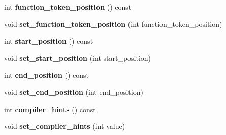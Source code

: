 \begin{DoxyCompactItemize}
\item 
int {\bfseries function\+\_\+token\+\_\+position} () const \hypertarget{classv8_1_1internal_1_1_shared_function_info_a5b7a18812dfb0269806e52073d1b91d8}{}\label{classv8_1_1internal_1_1_shared_function_info_a5b7a18812dfb0269806e52073d1b91d8}

\item 
void {\bfseries set\+\_\+function\+\_\+token\+\_\+position} (int function\+\_\+token\+\_\+position)\hypertarget{classv8_1_1internal_1_1_shared_function_info_a2f9fa5e11c55f28fe3a606d7411e9446}{}\label{classv8_1_1internal_1_1_shared_function_info_a2f9fa5e11c55f28fe3a606d7411e9446}

\item 
int {\bfseries start\+\_\+position} () const \hypertarget{classv8_1_1internal_1_1_shared_function_info_a0eb9c75c3fdae7d2007cbe23043abc73}{}\label{classv8_1_1internal_1_1_shared_function_info_a0eb9c75c3fdae7d2007cbe23043abc73}

\item 
void {\bfseries set\+\_\+start\+\_\+position} (int start\+\_\+position)\hypertarget{classv8_1_1internal_1_1_shared_function_info_a2dc3eb34dde73ca6833bf32f5d5fcc41}{}\label{classv8_1_1internal_1_1_shared_function_info_a2dc3eb34dde73ca6833bf32f5d5fcc41}

\item 
int {\bfseries end\+\_\+position} () const \hypertarget{classv8_1_1internal_1_1_shared_function_info_ae56b51628788a0ce481a69296f21acf3}{}\label{classv8_1_1internal_1_1_shared_function_info_ae56b51628788a0ce481a69296f21acf3}

\item 
void {\bfseries set\+\_\+end\+\_\+position} (int end\+\_\+position)\hypertarget{classv8_1_1internal_1_1_shared_function_info_a552ba314feef593fb25cf9cfcf83ae8e}{}\label{classv8_1_1internal_1_1_shared_function_info_a552ba314feef593fb25cf9cfcf83ae8e}

\item 
int {\bfseries compiler\+\_\+hints} () const \hypertarget{classv8_1_1internal_1_1_shared_function_info_a5614b8fba4ff996999c2643969024ff5}{}\label{classv8_1_1internal_1_1_shared_function_info_a5614b8fba4ff996999c2643969024ff5}

\item 
void {\bfseries set\+\_\+compiler\+\_\+hints} (int value)\hypertarget{classv8_1_1internal_1_1_shared_function_info_aca049e0daf2f44352f963eff1e6de2df}{}\label{classv8_1_1internal_1_1_shared_function_info_aca049e0daf2f44352f963eff1e6de2df}


\end{DoxyCompactItemize}

